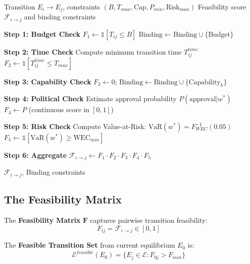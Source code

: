 \begin{algorithm}[H]
\caption{Feasibility Assessment (FEAS)}
\label{alg:feasibility}
\begin{algorithmic}[1]
\Require Transition $E_i \to E_j$, constraints $(B, T_{max}, \text{Cap}, P_{min}, \text{Risk}_{max})$
\Ensure Feasibility score $\mathcal{F}_{i \to j}$ and binding constraints

\State \textbf{Step 1: Budget Check}
\State $F_1 \gets \mathbb{1}[T_{ij} \leq B]$
    \State $\text{Binding} \gets \text{Binding} \cup \{\text{Budget}\}$
\EndIf

\State \textbf{Step 2: Time Check}
\State Compute minimum transition time $T_{ij}^{time}$
\State $F_2 \gets \mathbb{1}[T_{ij}^{time} \leq T_{max}]$

\State \textbf{Step 3: Capability Check}
        \State $F_3 \gets 0$; $\text{Binding} \gets \text{Binding} \cup \{\text{Capability}_k\}$
    \EndIf
\EndFor

\State \textbf{Step 4: Political Check}
\State Estimate approval probability $P(\text{approval} | w^*)$
\State $F_4 \gets P$ (continuous score in $[0,1]$)

\State \textbf{Step 5: Risk Check}
\State Compute Value-at-Risk: $\text{VaR}(w^*) = F^{-1}_{WEC}(0.05)$
\State $F_5 \gets \mathbb{1}[\text{VaR}(w^*) \geq \text{WEC}_{min}]$

\State \textbf{Step 6: Aggregate}
\State $\mathcal{F}_{i \to j} \gets F_1 \cdot F_2 \cdot F_3 \cdot F_4 \cdot F_5$

\Return $\mathcal{F}_{i \to j}$, Binding constraints
\end{algorithmic}
\end{algorithm}

\subsection{The Feasibility Matrix}

\begin{definition}
The \textbf{Feasibility Matrix} $\mathbf{F}$ captures pairwise transition feasibility:
\begin{equation}
F_{ij} = \mathcal{F}_{i \to j} \in [0, 1]
\end{equation}

The \textbf{Feasible Transition Set} from current equilibrium $E_0$ is:
\begin{equation}
\mathcal{E}^{feasible}(E_0) = \{E_j \in \mathcal{E} : F_{0j} > F_{min}\}
\end{equation}
\end{definition}

